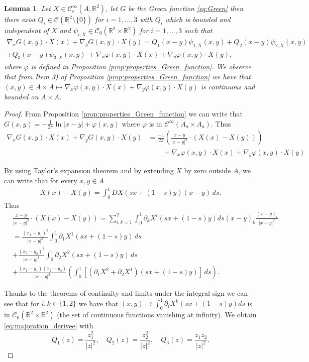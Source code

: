 \documentclass[12pt,reqno]{amsart}
\newtheorem{lemma}[theorem]{Lemma}
\def\C{{\mathcal C}}
\def \p {\partial}
\newcommand{\R}{\mathbb{R}}
\numberwithin{equation}{section}
\begin{document}
\begin{lemma}\label{lem:domination}
Let \(X\in \C^\infty_c(A,\R^2)\), let \(G\) be the Green function \eqref{eq:Green} then there exist \(Q_i\in \C(\R^2\setminus \{0\})\) for \(i=1,\dots,3\) with \(Q_i\) which is bounded and independent of \(X\) and \(\psi_{i,X}\in \C_0(\R^2\times \R^2)\) for \(i=1,\dots,3\) such that 
\begin{multline}\label{eq:majoration_derivee}
\nabla _x G(x,y)\cdot X(x) + \nabla _y G(x,y)\cdot X(y) = Q_1(x-y)\psi_{1,X}(x,y)+ Q_2(x-y)\psi_{2,X}(x,y)\\+ Q_3(x-y)\psi_{3,X}(x,y)\
+\nabla _x \varphi(x,y)\cdot X(x) + \nabla _y \varphi(x,y)\cdot X(y),
\end{multline}
where \(\varphi\) is defined in Proposition \ref{prop:properties_Green_function}.
We observe that from Item 3) of Proposition \ref{prop:properties_Green_function} we have that \((x,y)\in A\times A \mapsto \nabla _x \varphi(x,y)\cdot X(x) + \nabla _y \varphi(x,y)\cdot X(y)\) is continuous and bounded on \(A\times A\).
\end{lemma}

\begin{proof}
From Proposition \ref{prop:properties_Green_function} we can write that \(G(x,y)=-\frac{1}{2\pi}\ln |x-y|+\varphi(x,y)\) where \(\varphi\) is in \(\C^\infty(A_a\times A_a)\). Thus
\begin{align*}
\nabla _x G(x,y)\cdot X(x) + \nabla _y G(x,y)\cdot X(y) & =\frac{-1}{2\pi}\left(\frac{x-y}{|x-y|^2}\cdot (X(x)-X(y))\right) \\
& \phantom{aaaa} +\nabla _x \varphi(x,y)\cdot X(x) + \nabla _y \varphi(x,y)\cdot X(y)
\end{align*}

By using Taylor's expansion theorem and by extending \(X\) by zero outside \(A\), we can write that for every \(x,y\in A\)
\begin{align*}
X(x)-X(y)=\int_0^1 DX(sx+(1-s)y)(x-y)\, ds .
\end{align*}
Thus
\begin{align*}
&\frac{x-y}{|x-y|^2}\cdot (X(x)-X(y)) =\sum_{i,k=1}^2\int_0^1 \p_kX^i(sx+(1-s)y)ds (x-y)_k\frac{(x-y)_i}{|x-y|^2} \\
&= \frac{(x_1-y_1)^2}{|x-y|^2} \int_0^1 \p_1X^1 (sx+(1-s)y) \, ds \\
& +\frac{(x_2-y_2)^2}{|x-y|^2} \int_0^1 \p_2X^2 (sx+(1-s)y) \, ds  \\
&+ \frac{(x_1-y_1)(x_2-y_2)}{|x-y|^2}\left(\int_0^1 \left[(\p_1X^2+\p_2X^1)(sx+(1-s)y) \right] \, ds \right).
\end{align*}

Thanks to the theorems of continuity and limits under the integral sign we can see that for \(i,k\in \{1,2\}\) we have that \((x,y)\mapsto \int_0^1 \p_i X^k (sx+(1-s)y)ds\) is in \(\C_0(\R^2\times \R^2)\) (the set of continuous functions vanishing at infinity). We obtain \eqref{eq:majoration_derivee} with
\[ Q_1(z)=\frac{z_1^2}{|z|^2}, \quad Q_2(z)=\frac{z_2^2}{|z|^2}, \quad Q_3(z)= \frac{z_1z_2}{|z|^2}.\]



\end{proof}
\end{document}
